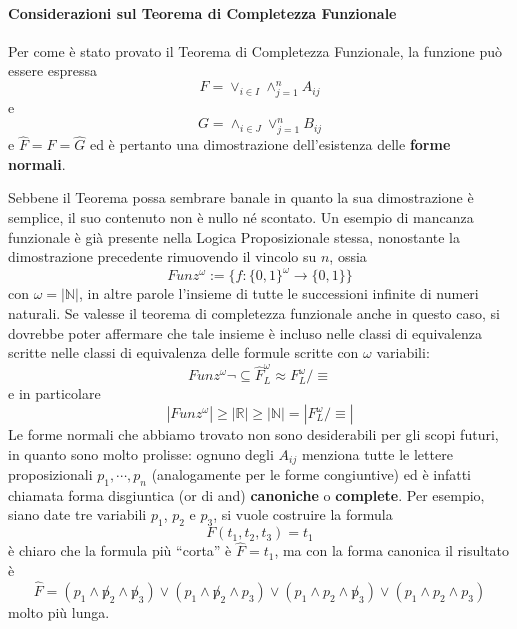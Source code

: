\paragraph{Considerazioni sul Teorema di Completezza Funzionale}
Per come è stato provato il Teorema di Completezza Funzionale, la funzione può 
essere espressa 
$$
F = \lor_{i \in I} \land_{j = 1}^{n} A_{ij}
$$
e 
$$
G = \land_{i \in J} \lor_{j = 1}^{n} B_{ij}
$$
e $\hat{F} = F = \hat{G}$ ed è pertanto una dimostrazione dell'esistenza 
delle \textbf{forme normali}. 

Sebbene il Teorema possa sembrare banale in quanto la sua dimostrazione è
semplice, il suo contenuto non è nullo né scontato. Un esempio di mancanza 
funzionale è già presente nella Logica Proposizionale stessa, nonostante 
la dimostrazione precedente rimuovendo il vincolo su $n$, ossia 
$$
Funz^{\omega} := \{f:\{0,1\}^{\omega} \rightarrow \{0,1\}\}
$$
con $\omega = |\mathbb{N}|$, in altre parole l'insieme di tutte le successioni 
infinite di numeri naturali. Se valesse il teorema di completezza funzionale 
anche in questo caso, si dovrebbe poter affermare che tale insieme 
è incluso nelle classi di equivalenza scritte nelle classi di equivalenza 
delle formule scritte con $\omega$ variabili: 
$$
Funz^{\omega} \neg \subseteq \hat{F}^{\omega}_{L} \approx F_L^{\omega}/\equiv
$$
e in particolare 
$$
|Funz^{\omega}| \geq |\mathbb{R}| \geq |\mathbb{N}| = |F_L^{\omega}/\equiv|
$$
Le forme normali che abbiamo trovato non sono desiderabili per gli scopi 
futuri, in quanto sono molto prolisse: ognuno degli $A_{ij}$ menziona 
tutte le lettere proposizionali $p_1, \cdots, p_n$ (analogamente per le 
forme congiuntive) ed è infatti chiamata forma disgiuntica (or di and) 
\textbf{canoniche} o \textbf{complete}. Per esempio, siano date tre variabili 
$p_1$, $p_2$ e $p_3$, si vuole costruire la formula 
$$
F(t_1, t_2, t_3) = t_1
$$
è chiaro che la formula più ``corta'' è $\hat{F} = t_1$, ma con la forma 
canonica il risultato è 
$$
\hat{F} = (p_1 \land \not p_2 \land \not p_3) \lor (p_1 \land \not p_2 \land p_3) \lor (p_1 \land p_2 \land \not p_3) \lor (p_1 \land p_2 \land p_3)
$$
molto più lunga.
